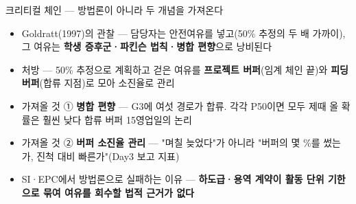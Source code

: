 \begin{frame}{크리티컬 체인 — 방법론이 아니라 두 개념을 가져온다}
\begin{itemize}
\item Goldratt(1997)의 관찰 — 담당자는 안전여유를 넣고(50\% 추정의 두 배 가까이), 그 여유는 \textbf{학생 증후군·파킨슨 법칙·병합 편향}으로 낭비된다
\item 처방 — 50\% 추정으로 계획하고 걷은 여유를 \textbf{프로젝트 버퍼}(임계 체인 끝)와 \textbf{피딩 버퍼}(합류 지점)로 모아 소진율로 관리
\item 가져올 것 ① \textbf{병합 편향} — G3에 여섯 경로가 합류. 각각 P50이면 모두 제때 올 확률은 훨씬 낮다 \ra{} 합류 버퍼 15영업일의 논리
\item 가져올 것 ② \textbf{버퍼 소진율 관리} — "며칠 늦었다"가 아니라 "버퍼의 몇 \%를 썼는가, 진척 대비 빠른가"(Day3 보고 지표)
\item SI·EPC에서 방법론으로 실패하는 이유 — \textbf{하도급·용역 계약이 활동 단위 기한으로 묶여 여유를 회수할 법적 근거가 없다}
\end{itemize}
\end{frame}

